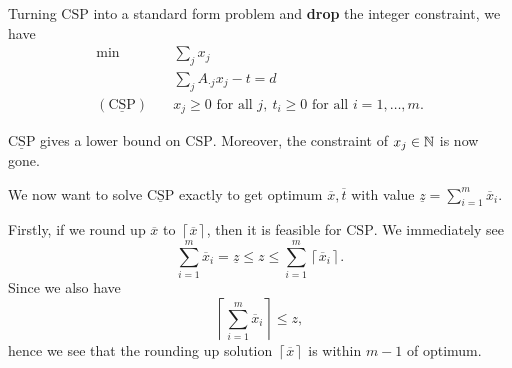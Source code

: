 \begin{problem}
\begin{answer}
	Turning \(\mathrm{CSP}\) into a standard form problem and \textbf{drop} the integer constraint, we have
	\begin{align*}
		\min~                           & \sum\limits_{j} x_{j}                                                         \\
		                                & \sum\limits_{j} A_{\cdot j}x_{j} - t = d                                      \\
		(\mathrm{\underline{CSP}})\quad & x_{j}\geq 0 \text{ for all }j,\ t_{i}\geq 0\text{ for all }i = 1, \ldots , m.
	\end{align*}

	\begin{note}
		\(\mathrm{\underline{CSP}}\) gives a lower bound on \(\mathrm{CSP}\). Moreover, the constraint of \(x_{j}\in\mathbb{\MakeUppercase{N}}\)
		is now gone.
	\end{note}

	We now want to solve \(\mathrm{\underline{CSP}}\) exactly to get optimum \(\overline{x}, \overline{t}\) with value
	\(\underline{z} = \sum\limits_{i=1}^{m} \overline{x}_{i}\).

	Firstly, if we round up \(\overline{x}\) to \(\left\lceil \overline{x} \right\rceil \), then it is feasible for \(\mathrm{CSP}\).
	We immediately see
	\[
		\sum\limits_{i=1}^{m} \overline{x}_{i} = \underline{z} \leq z \leq \sum\limits_{i=1}^{m} \left\lceil \overline{x}_{i} \right\rceil.
	\]
	Since we also have
	\[
		\left\lceil \sum\limits_{i=1}^{m} \overline{x}_{i} \right\rceil \leq z,
	\]
	hence we see that the rounding up solution \(\left\lceil \overline{x} \right\rceil \) is within \(m-1\) of optimum.


\end{answer}
\end{problem}
